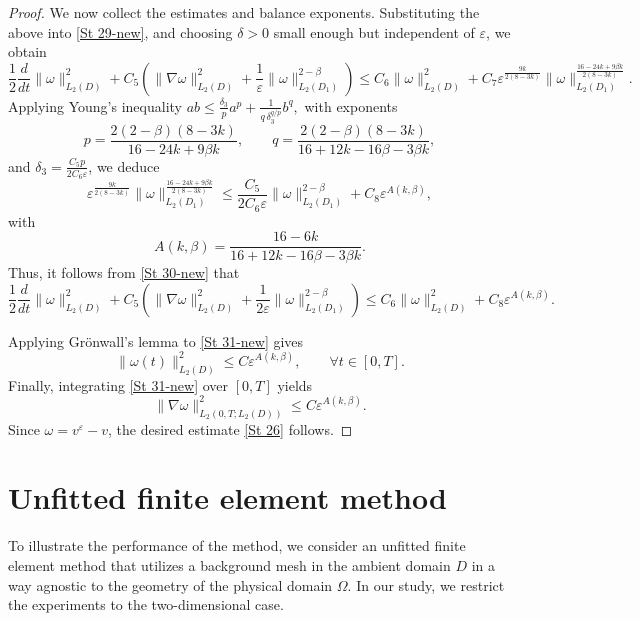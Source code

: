 \documentclass[11pt]{article}
\begin{document}
\begin{proof}
	\medskip
	We now  collect the  estimates and balance exponents.  
	Substituting the above into \eqref{St 29-new}, {and choosing $\delta>0$ small enough but independent of $\varepsilon$}, we obtain
	\begin{equation} \label{St 30-new}
		\frac{1}{2}\frac{d}{dt}\|\omega\|_{L_2(D)}^2
		+ C_5\left( \|\nabla \omega\|_{L_2(D)}^2 + \frac{1}{\varepsilon}\|\omega\|^{2-\beta}_{L_2(D_1)} \right)
		\le C_6 \|\omega\|_{L_2(D)}^2
		+ C_7 \varepsilon^{\frac{9k}{2(8-3k)}} \|\omega\|_{L_2(D_1)}^{\frac{16-24k+9\beta k}{2(8-3k)}}.
	\end{equation}
	Applying Young’s inequality {$ab \le \frac{\delta_3}{p} a^p
	+ \frac{1}{q\,\delta_3^{q/p}} b^q,$} with exponents
	\[
	p=\frac{2(2-\beta)(8-3k)}{16-24k+9\beta k}, 
	\qquad 
	q=\frac{2(2-\beta)(8-3k)}{16+12k-16\beta-3\beta k},
	\]
	and  {$\delta_3=\frac{C_5 p}{2C_6 \varepsilon}$}, we deduce
	\[
	\varepsilon^{\frac{9k}{2(8-3k)}} \|\omega\|_{L_2(D_1)}^{\frac{16-24k+9\beta k}{2(8-3k)}}
	\leq \frac{C_5}{2C_6\varepsilon}\|\omega\|^{2-\beta}_{L_2(D_1)}
	+ C_8 \varepsilon^{A(k,\beta)},
	\]
	with
	\[
	A(k,\beta) = \frac{{16-6k}}{16+12k -16\beta - 3\beta k}.
	\]
Thus, it follows from \eqref{St 30-new} that
	\begin{equation} \label{St 31-new}
		\frac{1}{2}\frac{d}{dt}\|\omega\|^2_{L_2(D)}
		+ C_5\left( \|\nabla \omega\|_{L_2(D)}^2 + \frac{1}{2\varepsilon}\|\omega\|^{2-\beta}_{L_2(D_1)} \right)
		\leq C_6 \|\omega\|_{L_2(D)}^2 + C_8 \varepsilon^{A(k,\beta)}.
	\end{equation}
	
Applying Grönwall’s lemma to \eqref{St 31-new} gives
	\[
	\|\omega(t)\|^2_{L_2(D)} \le C \varepsilon^{A(k,\beta)}, 
	\qquad \forall t \in [0,T].
	\]
Finally, integrating \eqref{St 31-new} over $[0,T]$ yields
	\[
	\|\nabla \omega\|^2_{L_2(0,T;L_2(D))} \le C \varepsilon^{A(k,\beta)}.
	\]
Since $\omega = v^\varepsilon - v$, the desired estimate \eqref{St 26} follows. 
\end{proof}



\section{Unfitted finite element method} \label{S6}

\label{sec.method}

To illustrate the performance of the method, we consider an unfitted finite element method that utilizes a background mesh in the ambient domain $D$ in a way agnostic to the geometry of the physical domain $\Omega$. In our study, we restrict the experiments to the two-dimensional case.  
\medskip
\end{document}
